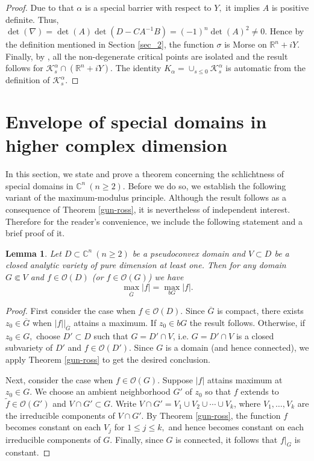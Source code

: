 \documentclass[12pt,reqno, a4paper]{amsart}
\newtheorem{lemma}[theorem]{Lemma}
\theoremstyle{definition}
\theoremstyle{definition}
\numberwithin{equation}{section}
\def\R{\mathbb{R}}                              %
\def\C{\mathbb{C}}                              %
\begin{document}
\begin{proof}
 Due to that $\alpha$ is a special barrier with respect to $Y,$ it implies $A$ is positive definite. Thus, $\det(\nabla)=\det(A)\det(D-CA^{-1}B)=(-1)^n \det(A)^2\neq 0.$ Hence by the definition mentioned in Section \ref{sec_2}, the function $\sigma$ is Morse on $\R^n+iY$. Finally, by {\cite[Corollary 2.3]{milnor}}, all the non-degenerate critical points are isolated and the result follows for $\mathcal{K}_{s}^{\alpha}\cap(\R^n+iY)$. The identity $K_{\alpha}=\cup_{s\leq 0} \mathcal{K}_{s}^{\alpha}$ is automatic from the definition of $\mathcal{K}_{s}^{\alpha}.$
\end{proof}




\section{Envelope of special domains in higher complex dimension}\label{sec_5}
In this section, we state and prove a theorem concerning the schlichtness of special domains in $\C^n~(n\geq 2)$.  Before we do so, we establish the following variant of the maximum-modulus principle. Although the result follows as a consequence of Theorem \ref{gun-ross}, it is nevertheless of independent interest. 
Therefore for the reader's convenience, we include the following statement and a brief proof of it.
	
\begin{lemma}\label{key_max_lemma_var}
	Let $D\subset \C^n~(n\geq 2)$ be a pseudoconvex domain and $V\subset D$ be a closed analytic variety of pure dimension at least one. Then for any domain $G\Subset V$ and $f\in \mathcal{O}(D)$ (or $f\in \mathcal{O}(G)$) we have
	$$\max_{\overline{G}}|f|=\max_{bG}|f|.$$
\end{lemma}
\begin{proof}
First consider the case when $f\in \mathcal{O}(D)$.
Since $\overline{G}$ is compact, there exists $z_0\in \overline{G}$ when $|f|\big|_{\overline{G}}$ attains a maximum. If $z_0\in bG$ the result follows. Otherwise, if $z_0\in G,$ choose $D'\subset D$ such that $G=D'\cap V$, i.e. $G=D'\cap V$ is a closed subvariety of $D'$ and $f\in \mathcal{O}(D').$ Since $G$ is a domain (and hence connected), we apply Theorem \ref{gun-ross} to get the desired conclusion.

Next, consider the case when $f\in \mathcal{O}(G)$. Suppose $|f|$ attains maximum at $z_0\in G$. We choose an ambient neighborhood $G'$ of $z_0$ so that $f$ extends to $\widetilde{f}\in \mathcal{O}(G')$ and $V\cap G'\subset G.$ Write $V\cap G'=V_1 \cup V_2\cup \cdots \cup V_k$, where $V_1,\ldots,V_k$ are the irreducible components of $V\cap G'$. By Theorem \ref{gun-ross}, the function $f$ becomes constant on each $V_j$ for $1\leq j\leq k,$ and hence becomes constant on each irreducible components of $G.$ Finally, since $G$ is connected, it follows that $f|_G$ is constant.
\end{proof}
\end{document}
